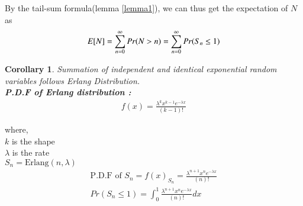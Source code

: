 \documentclass[journal,12pt,twocolumn]{IEEEtran}
\newtheorem{corollary}{Corollary}[theorem]
\theoremstyle{definition}
\begin{document}
By the tail-sum formula(lemma \ref{lemma1}), we can thus get the expectation of $N$ as\\
\begin{align}
    E[ N ] = \sum ^\infty _{n = 0} Pr(N > n) = \sum ^\infty _{n = 0} Pr(S_n \leq 1)
\end{align}

\begin{corollary}
Summation of independent and identical exponential random variables follows Erlang Distribution.\\
\textbf{P.D.F of Erlang distribution : }\\
\begin{align}
    f(x) = \frac{\lambda^{k} x^{k-1}e^{-\lambda x}}{(k-1)!}
\end{align}
\end{corollary}
where,\\
$k$ is the shape\\
$\lambda$ is the rate\\

$S_n = \text{Erlang}(n,\lambda)$ \\
\begin{align}
    \text{P.D.F of }S_n = f(x)_{S_n} = \frac{\lambda^{n+1} x^{n}e^{-\lambda x}}{(n)!}\\
    Pr(S_n \leq 1) = \int _0 ^1 \frac{\lambda^{n+1} x^{n}e^{-\lambda x}}{(n)!} dx
\end{align}
 \\ \\ \\
\end{document}
